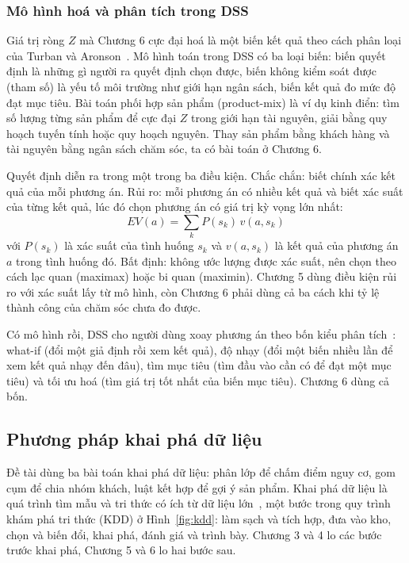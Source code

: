 \subsubsection{Mô hình hoá và phân tích trong DSS}
Giá trị ròng $Z$ mà Chương 6 cực đại hoá là một biến kết quả theo cách phân loại của Turban và Aronson~\cite{turban2005}. Mô hình toán trong DSS có ba loại biến: biến quyết định là những gì người ra quyết định chọn được, biến không kiểm soát được (tham số) là yếu tố môi trường như giới hạn ngân sách, biến kết quả đo mức độ đạt mục tiêu. Bài toán phối hợp sản phẩm (product-mix) là ví dụ kinh điển: tìm số lượng từng sản phẩm để cực đại $Z$ trong giới hạn tài nguyên, giải bằng quy hoạch tuyến tính hoặc quy hoạch nguyên. Thay sản phẩm bằng khách hàng và tài nguyên bằng ngân sách chăm sóc, ta có bài toán ở Chương 6.

Quyết định diễn ra trong một trong ba điều kiện. Chắc chắn: biết chính xác kết quả của mỗi phương án. Rủi ro: mỗi phương án có nhiều kết quả và biết xác suất của từng kết quả, lúc đó chọn phương án có giá trị kỳ vọng lớn nhất:
\begin{equation}
    EV(a) = \sum_{k} P(s_k)\, v(a, s_k)
\end{equation}
với $P(s_k)$ là xác suất của tình huống $s_k$ và $v(a, s_k)$ là kết quả của phương án $a$ trong tình huống đó. Bất định: không ước lượng được xác suất, nên chọn theo cách lạc quan (maximax) hoặc bi quan (maximin). Chương 5 dùng điều kiện rủi ro với xác suất lấy từ mô hình, còn Chương 6 phải dùng cả ba cách khi tỷ lệ thành công của chăm sóc chưa đo được.

Có mô hình rồi, DSS cho người dùng xoay phương án theo bốn kiểu phân tích~\cite{turban2005}: what-if (đổi một giả định rồi xem kết quả), độ nhạy (đổi một biến nhiều lần để xem kết quả nhạy đến đâu), tìm mục tiêu (tìm đầu vào cần có để đạt một mục tiêu) và tối ưu hoá (tìm giá trị tốt nhất của biến mục tiêu). Chương 6 dùng cả bốn.

\subsection{Phương pháp khai phá dữ liệu}
Đề tài dùng ba bài toán khai phá dữ liệu: phân lớp để chấm điểm nguy cơ, gom cụm để chia nhóm khách, luật kết hợp để gợi ý sản phẩm. Khai phá dữ liệu là quá trình tìm mẫu và tri thức có ích từ dữ liệu lớn~\cite{han2011}, một bước trong quy trình khám phá tri thức (KDD) ở Hình~\ref{fig:kdd}: làm sạch và tích hợp, đưa vào kho, chọn và biến đổi, khai phá, đánh giá và trình bày. Chương 3 và 4 lo các bước trước khai phá, Chương 5 và 6 lo hai bước sau.

